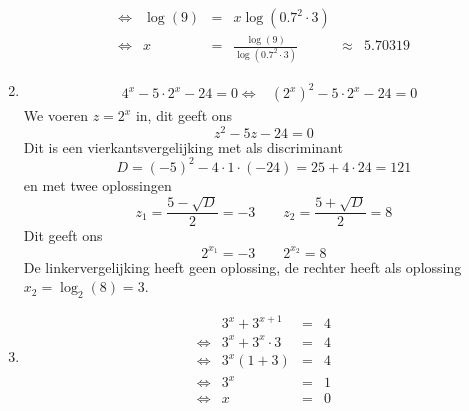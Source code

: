 \begin{oef}
\begin{opl}
\begin{enumerate}
\[\begin{array}{rrclcl}
            \iff & \log(9) & = & x \log(0.7^2 \cdot 3) \\
            \iff & x & = & \frac{\log(9)}{\log(0.7^2 \cdot 3)} & \approx & 5.70319
          \end{array}
        \]
  \item \[
          \begin{array}{rrclcl}
                 & 4^x - 5 \cdot 2^x - 24 = 0
            \iff & (2^x)^2 - 5 \cdot 2^x - 24 = 0
          \end{array}
        \]
        We voeren $z = 2^x$ in, dit geeft ons
        \[
          z^2 - 5z - 24 = 0
        \]
        Dit is een vierkantsvergelijking met als discriminant
        \[
          D = (-5)^2 - 4 \cdot 1 \cdot (-24) = 25 + 4 \cdot 24 = 121
        \]
        en met twee oplossingen
        \[
          z_1 = \frac{5 - \sqrt{D}}{2} = -3 \qquad z_2 = \frac{5+\sqrt{D}}{2} = 8
        \]
        Dit geeft ons
        \[
          2^{x_1} = -3 \qquad 2^{x_2} = 8
        \]
        De linkervergelijking heeft geen oplossing, de rechter heeft als oplossing $x_2 = \log_2(8) = 3$.
  \item \[
          \begin{array}{rrclcl}
                 & 3^x+3^{x+1} & = & 4 \\
            \iff & 3^x+3^x\cdot3 & = & 4 \\
            \iff & 3^x(1+3) & = & 4 \\
            \iff & 3^x & = & 1 \\
            \iff & x & = & 0
          \end{array}
        \]
\end{enumerate}
\end{opl}
\end{oef}

